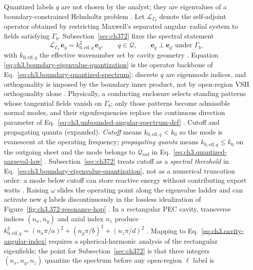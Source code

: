 Quantized labels \(q\) are not chosen by the analyst; they are eigenvalues of a boundary-constrained Helmholtz problem
\cite{stratton1941}. Let \(\mathcal{L}_{\Gamma_{b}}\) denote the self-adjoint operator obtained
by restricting Maxwell's separated angular--radial system to fields satisfying \(\Gamma_{b}\). Subsection~\ref{sec:ch372}
fixes the spectral statement
\begin{equation}
\label{eq:ch3.boundary-eigenvalue-quantization}
\mathcal{L}_{\Gamma_{b}}\,\mathbf{e}_{q}
=
k_{0,\mathrm{eff},q}^{2}\,\mathbf{e}_{q},
\qquad
q\in\mathcal{Q},
\qquad
\mathbf{e}_{q}\perp\mathbf{e}_{q'}\ \text{under }\Gamma_{b},
\end{equation}
with \(k_{0,\mathrm{eff},q}\) the effective wavenumber set by cavity geometry \cite{jackson1999}. Equation
\eqref{eq:ch3.boundary-eigenvalue-quantization} is the operator backbone of Eq.~\eqref{eq:ch3.boundary-quantized-spectrum}:
discrete \(q\) are eigenmode indices, and orthogonality is imposed by the boundary inner product, not by open-region VSH orthogonality
alone \cite{hansen1988}. Physically, a conducting enclosure selects standing patterns whose tangential fields
vanish on \(\Gamma_{b}\); only those patterns become admissible normal modes, and their eigenfrequencies replace the continuous
direction parameter of Eq.~\eqref{eq:ch3.unbounded-angular-spectrum-def} \cite{stratton1941}.
Cutoff and propagating quanta (expanded). \emph{Cutoff} means \(k_{0,\mathrm{eff},q}<k_{0}\) so the mode is evanescent at the operating frequency; \emph{propagating quanta}
means \(k_{0,\mathrm{eff},q}\le k_{0}\) on the outgoing sheet and the mode belongs to \(\mathcal{Q}_{\mathrm{rad}}\) in
Eq.~\eqref{eq:ch3.quantized-parseval-law} \cite{jackson1999}. Subsection~\ref{sec:ch372} treats cutoff as a
\emph{spectral threshold} in Eq.~\eqref{eq:ch3.boundary-eigenvalue-quantization}, not as a numerical truncation order: a mode below cutoff
can store reactive energy without contributing export watts \cite{harrington2001}. Raising \(\omega\) slides the operating point
along the eigenvalue ladder and can activate new \(q\) labels discontinuously in the lossless idealization of
Figure~\ref{fig:ch3.372-resonance-hop} \cite{jackson1999}.
In a rectangular PEC cavity, transverse indices \((n_{x},n_{y})\) and axial index \(n_{z}\) produce
\(k_{0,\mathrm{eff},q}^{2}=(n_{x}\pi/a)^{2}+(n_{y}\pi/b)^{2}+(n_{z}\pi/d)^{2}\) \cite{jackson1999}. Mapping to
Eq.~\eqref{eq:ch3.cavity-angular-index} requires a spherical-harmonic analysis of the rectangular eigenfields; the point for
Subsection~\ref{sec:ch372} is that three integers \((n_{x},n_{y},n_{z})\) quantize the spectrum before any open-region \(\ell\) label is
